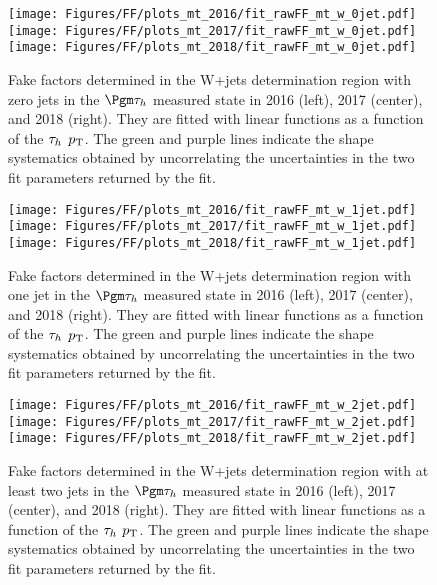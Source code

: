 \begin{figure}[ht!b]
\centering
\texttt{[image: Figures/FF/plots\_mt\_2016/fit\_rawFF\_mt\_w\_0jet.pdf]}
\texttt{[image: Figures/FF/plots\_mt\_2017/fit\_rawFF\_mt\_w\_0jet.pdf]}
\texttt{[image: Figures/FF/plots\_mt\_2018/fit\_rawFF\_mt\_w\_0jet.pdf]}\\
\caption{\label{fig:fit_raw_mt_0jet_w} Fake factors determined in the W+jets determination region with zero jets in the $\Pgm\tauh$ measured state in 2016 (left), 2017 (center), and 2018 (right). They are fitted with linear functions as a function of the $\tau_h$ $p_{\mathrm{T}}$. The green and purple lines indicate the shape systematics obtained by uncorrelating the uncertainties in the two fit parameters returned by the fit.  }
\end{figure}

\begin{figure}[ht!b]
\centering
\texttt{[image: Figures/FF/plots\_mt\_2016/fit\_rawFF\_mt\_w\_1jet.pdf]}
\texttt{[image: Figures/FF/plots\_mt\_2017/fit\_rawFF\_mt\_w\_1jet.pdf]}
\texttt{[image: Figures/FF/plots\_mt\_2018/fit\_rawFF\_mt\_w\_1jet.pdf]}\\
\caption{\label{fig:fit_raw_mt_1jet_w} Fake factors determined in the W+jets determination region with one jet in the $\Pgm\tauh$ measured state in 2016 (left), 2017 (center), and 2018 (right). They are fitted with linear functions as a function of the $\tau_h$ $p_{\mathrm{T}}$. The green and purple lines indicate the shape systematics obtained by uncorrelating the uncertainties in the two fit parameters returned by the fit.  }
\end{figure}

\begin{figure}[ht!b]
\centering
\texttt{[image: Figures/FF/plots\_mt\_2016/fit\_rawFF\_mt\_w\_2jet.pdf]}
\texttt{[image: Figures/FF/plots\_mt\_2017/fit\_rawFF\_mt\_w\_2jet.pdf]}
\texttt{[image: Figures/FF/plots\_mt\_2018/fit\_rawFF\_mt\_w\_2jet.pdf]}\\
\caption{\label{fig:fit_raw_mt_2jet_w} Fake factors determined in the W+jets determination region with at least two jets in the $\Pgm\tauh$ measured state in 2016 (left), 2017 (center), and 2018 (right). They are fitted with linear functions as a function of the $\tau_h$ $p_{\mathrm{T}}$. The green and purple lines indicate the shape systematics obtained by uncorrelating the uncertainties in the two fit parameters returned by the fit.  }
\end{figure}

